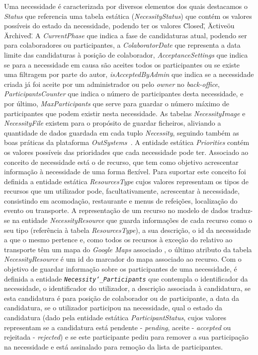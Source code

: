  
Uma necessidade é caracterizada por diversos elementos dos quais destacamos o \textit{Status} que referencia uma tabela estática (\textit{NecessityStatus}) que contém os valores possíveis do estado da necessidade, 
podendo ter os valores \"Closed\", \"Active\" ou \"Archived\". A \textit{CurrentPhase} que indica a fase de candidaturas atual, 
podendo ser para colaboradores ou participantes, a \textit{ColaboratorDate} que representa a data limite das candidaturas 
à posição de colaborador, \textit{AcceptanceSettings} que indica se para a necessidade em causa são aceites todos os participantes ou se existe uma filtragem por parte do autor, 
\textit{isAcceptedByAdmin} que indica se a necessidade criada já foi aceite por um administrador ou pelo \textit{owner} no \textit{back-office}, 
\textit{ParticipantsCounter} que indica o número de participantes desta necessidade, e por último, \textit{MaxParticipants} que serve para guardar o número máximo de participantes que podem existir nesta necessidade. 
As tabelas \textit{NecessityImage} e \textit{NecessityFile} existem para o propósito de guardar ficheiros, 
aliviando a quantidade de dados guardada em cada tuplo \textit{Necessity}, 
seguindo também as boas práticas da plataforma \textit{OutSystems~\cite{outsystems}}.
A entidade estática \textit{Priorities} contém os valores possíveis das prioridades que cada necessidade pode ter.
Associado ao conceito de necessidade está o de recurso, que tem como objetivo acrescentar informação à necessidade de uma forma flexível. 
Para suportar este conceito foi definida a entidade estática \textit{ResourcesType} cujos valores representam os tipos de recursos que um utilizador pode, facultativamente, acrescentar à necessidade, consistindo em acomodação, restaurante e menus de refeições, localização do evento ou transporte. 
A representação de um recurso no modelo de dados traduz-se na entidade \textit{NecessityResource} que guarda informações de cada recurso como o seu tipo (referência à tabela  \textit{ResourcesType}), a sua descrição, o id da necessidade a que o mesmo pertence e, como todos os recursos à exceção do relativo ao transporte têm um mapa do \textit{Google Maps} associado
, o último atributo da tabela \textit{NecessityResource} é um id do marcador do mapa associado ao recurso.
Com o objetivo de guardar informação sobre os participantes de uma necessidade, é definida a entidade \texttt{\textit{Necessity\char`_Participants}} que 
contempla o identificador da necessidade, o identificador do utilizador, a descrição associada à candidatura, 
se esta candidatura é para posição de colaborador ou de participante, a data da candidatura, se o utilizador participou na necessidade, qual o estado da candidatura (dado pela entidade estática \textit{ParticipantStatus}, cujos valores representam se a candidatura está pendente - \textit{pending}, aceite - \textit{accepted} ou rejeitada - \textit{rejected}) e se este participante pediu para remover a sua participação na necessidade e está assinalado para remoção da lista de participantes. 

